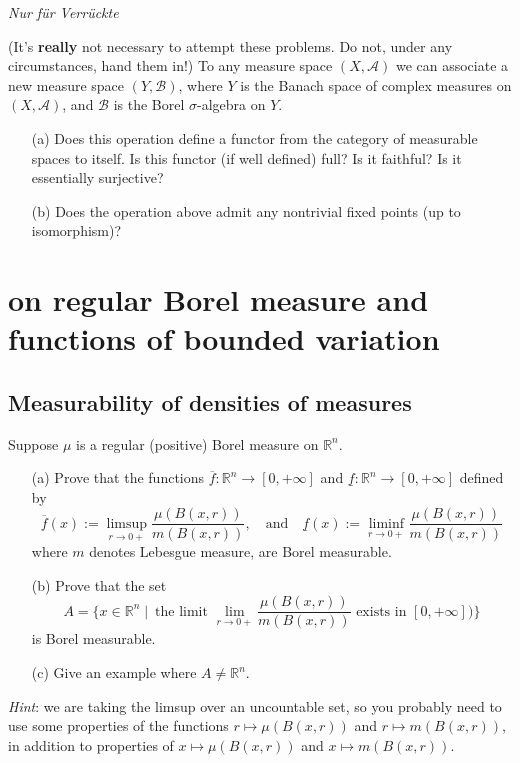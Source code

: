 \documentclass[lang=cn,11pt]{elegantbook}
\begin{document}
\vspace*{10mm}
\begin{center}
  \textit{Nur f\"ur Verr\"uckte}
\end{center}
(It's \textbf{really} not necessary to attempt these problems. Do not, under any circumstances, hand them in!)
  To any measure space $(X,\mathcal{A})$ we can associate a new measure space $(Y,\mathcal{B})$, where $Y$ is the Banach space of complex measures on $(X,\mathcal{A})$, and $\mathcal{B}$ is the Borel $\sigma$-algebra on $Y$.
  \begin{itemize}
  \item[(a)]Does this operation define a functor from the category of measurable spaces to itself. Is this functor (if well defined) full? Is it faithful? Is it essentially surjective?
  \item[(b)]Does the operation above admit any nontrivial fixed points (up to isomorphism)?
  \end{itemize}
  




\chapter{on regular Borel measure and functions of bounded variation}

\section{Measurability of densities of measures}
  Suppose $\mu$ is a regular (positive) Borel measure on $\mathbb{R}^n$.
  \begin{itemize}
  \item[(a)]Prove that the functions $\overline f\colon\mathbb{R}^n\to[0,+\infty]$ and $\underline f\colon\mathbb{R}^n\to[0,+\infty]$ defined by    \[
      \overline f(x):=\limsup_{r\to0+}\frac{\mu(B(x,r))}{m(B(x,r))},
      \quad\text{and}\quad
      \underline f(x):=\liminf_{r\to0+}\frac{\mu(B(x,r))}{m(B(x,r))}
    \]
    where $m$ denotes Lebesgue measure, are Borel measurable.
  \item[(b)]Prove that the set \[  A=\{x\in\mathbb{R}^n\mid\ \text{the limit $\lim_{r\to0+}\frac{\mu(B(x,r))}{m(B(x,r))}$ exists in $[0,+\infty]$)}\}
    \]    is Borel measurable.
  \item[(c)] Give an example where $A\ne\mathbb{R}^n$.
  \end{itemize}
\textit{Hint}: we are taking the limsup over an uncountable set, so you probably need to use some properties of the functions $r\mapsto\mu(B(x,r))$ and $r\mapsto m(B(x,r))$, in addition to properties of  $x\mapsto\mu(B(x,r))$ and $x\mapsto m(B(x,r))$.
\end{document}
